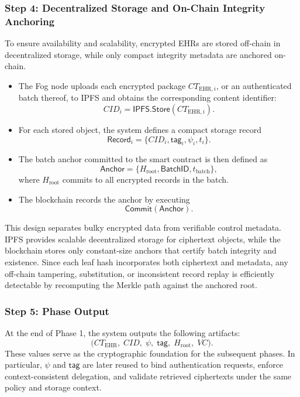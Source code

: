 \documentclass[conference]{IEEEtran}
\begin{document}
\subsubsection*{Step 4: Decentralized Storage and On-Chain Integrity Anchoring}

To ensure availability and scalability, encrypted EHRs are stored off-chain in decentralized storage, while only compact integrity metadata are anchored on-chain.

\begin{itemize}

\item The Fog node uploads each encrypted package $CT_{\text{EHR},i}$, or an authenticated batch thereof, to IPFS and obtains the corresponding content identifier:
\[
CID_i = \textsf{IPFS.Store}(CT_{\text{EHR},i}).
\]

\item For each stored object, the system defines a compact storage record
\[
\mathsf{Record}_i = \{CID_i, \mathsf{tag}_i, \psi_i, t_i\}.
\]

\item The batch anchor committed to the smart contract is then defined as
\[
\mathsf{Anchor} = \{H_{\text{root}}, \mathsf{BatchID}, t_{\text{batch}}\},
\]
where $H_{\text{root}}$ commits to all encrypted records in the batch.

\item The blockchain records the anchor by executing
\[
\textsf{Commit}(\mathsf{Anchor}).
\]

\end{itemize}

This design separates bulky encrypted data from verifiable control metadata. IPFS provides scalable decentralized storage for ciphertext objects, while the blockchain stores only constant-size anchors that certify batch integrity and existence. Since each leaf hash incorporates both ciphertext and metadata, any off-chain tampering, substitution, or inconsistent record replay is efficiently detectable by recomputing the Merkle path against the anchored root.

\subsubsection*{Step 5: Phase Output}

At the end of Phase 1, the system outputs the following artifacts:
\[
\bigl(CT_{\text{EHR}},\; CID,\; \psi,\; \mathsf{tag},\; H_{\text{root}},\; VC \bigr).
\]
These values serve as the cryptographic foundation for the subsequent phases. In particular, $\psi$ and $\mathsf{tag}$ are later reused to bind authentication requests, enforce context-consistent delegation, and validate retrieved ciphertexts under the same policy and storage context.
\end{document}
